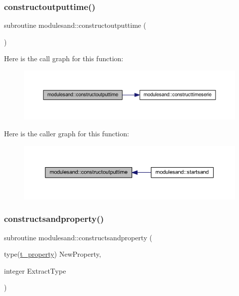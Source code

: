 \subsubsection{\texorpdfstring{constructoutputtime()}{constructoutputtime()}}
{\footnotesize\ttfamily subroutine modulesand\+::constructoutputtime (\begin{DoxyParamCaption}{ }\end{DoxyParamCaption})\hspace{0.3cm}{\ttfamily [private]}}

Here is the call graph for this function\+:\nopagebreak
\begin{figure}[H]
\begin{center}
\leavevmode
\includegraphics[width=350pt]{namespacemodulesand_a0db362913d03be6c3ddaab19327561ce_cgraph}
\end{center}
\end{figure}
Here is the caller graph for this function\+:\nopagebreak
\begin{figure}[H]
\begin{center}
\leavevmode
\includegraphics[width=350pt]{namespacemodulesand_a0db362913d03be6c3ddaab19327561ce_icgraph}
\end{center}
\end{figure}
\mbox{\label{namespacemodulesand_a04230d24a80d765152f92115bc61d5c4}} 
\subsubsection{\texorpdfstring{constructsandproperty()}{constructsandproperty()}}
{\footnotesize\ttfamily subroutine modulesand\+::constructsandproperty (\begin{DoxyParamCaption}\item[{type(\mbox{\hyperlink{structmodulesand_1_1t__property}{t\+\_\+property}})}]{New\+Property,  }\item[{integer}]{Extract\+Type }\end{DoxyParamCaption})\hspace{0.3cm}{\ttfamily [private]}}


